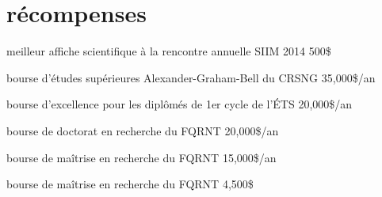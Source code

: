 \documentclass[]{friggeri-cv}
\newif\ifenglish
\begin{document}
\ifenglish\section{awards}\else\section{récompenses}\fi

\begin{entrylist}
  \ifenglish
    \entry {2014} {best scientific poster at the annual SIIM meeting} {500\$} {\vspace{-3mm}}
  \else
     {meilleur affiche scientifique à la rencontre annuelle SIIM 2014} {500\$} {\vspace{-3mm}}
  \fi
  \ifenglish
    \entry {2011} {bourse d’études supérieures Alexander-Graham-Bell du CRSNG} {35,000\$/an} {\vspace{-3mm}}
  \else
     {bourse d’études supérieures Alexander-Graham-Bell du CRSNG} {35,000\$/an} {\vspace{-3mm}}
  \fi
  \ifenglish
    \entry {2011} {bourse d'excellence pour les diplômés de 1er cycle de l'ÉTS} {20,000\$/an} {\vspace{-3mm}}
  \else
     {bourse d'excellence pour les diplômés de 1er cycle de l'ÉTS} {20,000\$/an} {\vspace{-3mm}}
  \fi
  \ifenglish
    \entry {2011} {bourse de doctorat en recherche du FQRNT} {20,000\$/an} {\vspace{-3mm}}
  \else
     {bourse de doctorat en recherche du FQRNT} {20,000\$/an} {\vspace{-3mm}}
  \fi
  \ifenglish
    \entry {2009} {bourse de maîtrise en recherche du FQRNT} {15,000\$/an} {\vspace{-3mm}}
  \else
     {bourse de maîtrise en recherche du FQRNT} {15,000\$/an} {\vspace{-3mm}}
  \fi
  \ifenglish
    \entry {2006} {bourse de maîtrise en recherche du FQRNT} {4,500\$} {\vspace{-3mm}}
  \else
     {bourse de maîtrise en recherche du FQRNT} {4,500\$} {\vspace{-3mm}}
  \fi
\end{entrylist}
\end{document}
